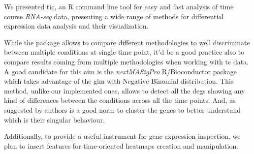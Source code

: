 We presented \gls{tic}, an R command line tool for easy and fast analysis of time course \textit{RNA-seq} data, presenting a wide range of methods for differential expression data analysis and their visualization.

While the package allows to compare different methodologies to well discriminate between multiple conditions at single time point, it'd be a good practice also to compare results coming from multiple methodologies when working with \gls{tc} data.
A good candidate for this aim is the \textit{nextMASigPro} R/Bioconductor package which takes advantage of the \gls{glm} with Negative Binomial distribution.
This method, unlike our implemented ones, allows to detect all the \glspl{deg} showing any kind of differences between the conditions across all the time points.
And, as suggested by authors is a good norm to cluster the genes to better understand which is their singular behaviour.

Additionally, to provide a useful instrument for gene expression inspection, we plan to insert features for time-oriented heatmaps creation and manipulation.
